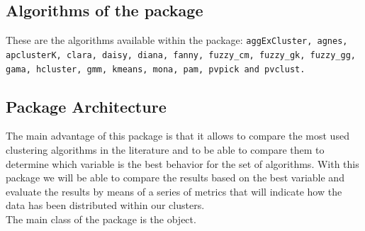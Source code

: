 \subsection{Algorithms of the package}
These are the algorithms available within the package: \texttt{aggExCluster, agnes, apclusterK, clara, daisy, diana, fanny, fuzzy\_cm, fuzzy\_gk, fuzzy\_gg, gama, hcluster, gmm, kmeans, mona, pam, pvpick and pvclust.}

\subsection{Package Architecture}

The main advantage of this package is that it allows to compare the most used clustering algorithms in the literature and to be able to compare them to determine which variable is the best behavior for the set of algorithms. With this package we will be able to compare the results based on the best variable and evaluate the results by means of a series of metrics that will indicate how the data has been distributed within our clusters.
\\
The main class of the package is the  object.
